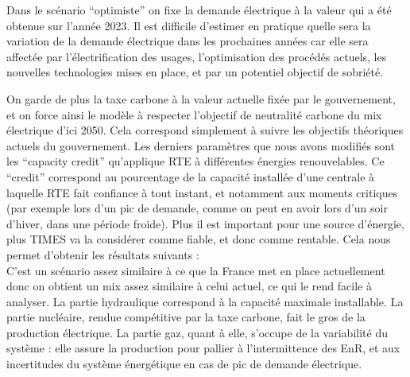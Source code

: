 \documentclass{article}
\theoremstyle{nopointbreak}
\theoremstyle{nobrkbold}
\begin{document}
Dans le scénario “optimiste” on fixe la demande électrique à la valeur qui a été obtenue sur l'année 2023. Il est difficile d’estimer en pratique quelle sera la variation de la demande électrique dans les prochaines années car elle sera affectée par l’électrification des usages, l’optimisation des procédés actuels, les nouvelles technologies mises en place, et par un potentiel objectif de sobriété. 

On garde de plus la taxe carbone à la valeur actuelle fixée par le gouvernement, et on force ainsi le modèle à respecter l’objectif de neutralité carbone du mix électrique d’ici 2050. Cela correspond simplement à suivre les objectifs théoriques actuels du gouvernement. 
Les derniers paramètres que nous avons modifiés sont les “capacity credit” qu’applique RTE à différentes énergies renouvelables. Ce “credit” correspond au pourcentage de la capacité installée d'une centrale à laquelle RTE fait confiance à tout instant, et notamment aux moments critiques (par exemple lors d’un pic de demande, comme on peut en avoir lors d’un soir d’hiver, dans une période froide). 
Plus il est important pour une source d'énergie, plus TIMES va la considérer comme fiable, et donc comme rentable. Cela nous permet d’obtenir les résultats suivants : \\
[graphe]
C’est un scénario assez similaire à ce que la France met en place actuellement donc on obtient un mix assez similaire à celui actuel, ce qui le rend facile à analyser. 
La partie hydraulique correspond à la capacité maximale installable. La partie nucléaire, rendue compétitive par la taxe carbone, fait le gros de la production électrique. 
La partie gaz, quant à elle, s’occupe de la variabilité du système : elle assure la production pour pallier à l’intermittence des EnR, et aux incertitudes du système énergétique en cas de pic de demande électrique. \\
\end{document}

